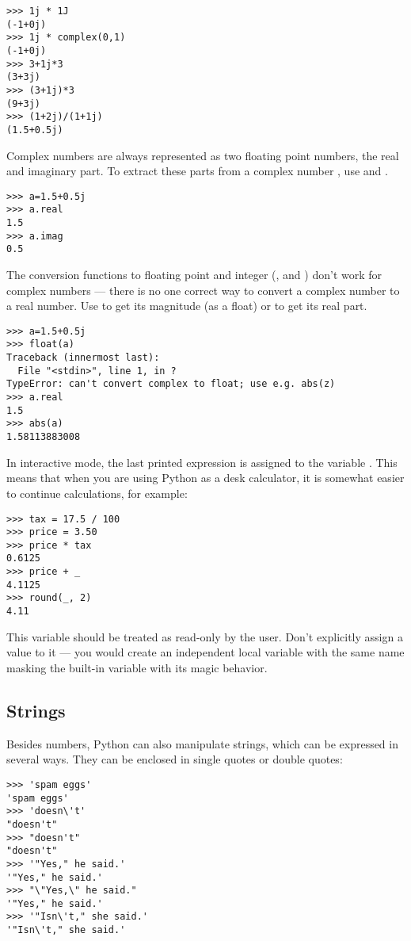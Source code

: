 \documentclass{manual}
\begin{document}
\begin{verbatim}
>>> 1j * 1J
(-1+0j)
>>> 1j * complex(0,1)
(-1+0j)
>>> 3+1j*3
(3+3j)
>>> (3+1j)*3
(9+3j)
>>> (1+2j)/(1+1j)
(1.5+0.5j)
\end{verbatim}
%
Complex numbers are always represented as two floating point numbers,
the real and imaginary part.  To extract these parts from a complex
number , use  and .  

\begin{verbatim}
>>> a=1.5+0.5j
>>> a.real
1.5
>>> a.imag
0.5
\end{verbatim}
%
The conversion functions to floating point and integer
(,  and ) don't
work for complex numbers --- there is no one correct way to convert a
complex number to a real number.  Use  to get its
magnitude (as a float) or  to get its real part.

\begin{verbatim}
>>> a=1.5+0.5j
>>> float(a)
Traceback (innermost last):
  File "<stdin>", line 1, in ?
TypeError: can't convert complex to float; use e.g. abs(z)
>>> a.real
1.5
>>> abs(a)
1.58113883008
\end{verbatim}
%
In interactive mode, the last printed expression is assigned to the
variable \code{_}.  This means that when you are using Python as a
desk calculator, it is somewhat easier to continue calculations, for
example:

\begin{verbatim}
>>> tax = 17.5 / 100
>>> price = 3.50
>>> price * tax
0.6125
>>> price + _
4.1125
>>> round(_, 2)
4.11
\end{verbatim}

This variable should be treated as read-only by the user.  Don't
explicitly assign a value to it --- you would create an independent
local variable with the same name masking the built-in variable with
its magic behavior.

\subsection{Strings \label{strings}}

Besides numbers, Python can also manipulate strings, which can be
expressed in several ways.  They can be enclosed in single quotes or
double quotes:

\begin{verbatim}
>>> 'spam eggs'
'spam eggs'
>>> 'doesn\'t'
"doesn't"
>>> "doesn't"
"doesn't"
>>> '"Yes," he said.'
'"Yes," he said.'
>>> "\"Yes,\" he said."
'"Yes," he said.'
>>> '"Isn\'t," she said.'
'"Isn\'t," she said.'
\end{verbatim}
\end{document}
